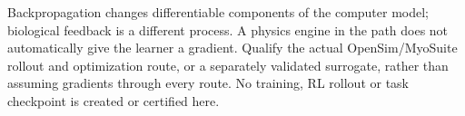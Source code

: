 Backpropagation changes differentiable components of the computer model;
biological feedback is a different process. A physics engine in the path does
not automatically give the learner a gradient. Qualify the actual
OpenSim/MyoSuite rollout and optimization route, or a separately validated
surrogate, rather than assuming gradients through every route. No training,
RL rollout or task checkpoint is created or certified here.

